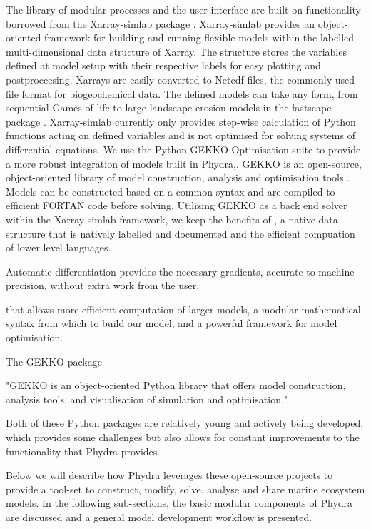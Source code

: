 \documentclass[template.tex]{subfiles}
\begin{document}
The library of modular processes and the user interface are built on functionality borrowed from the Xarray-simlab package \citep{Bovy2018Xarray-simlab:Interactively}. Xarray-simlab provides an object-oriented framework for building and running flexible models within the labelled multi-dimensional data structure of Xarray. The structure stores the variables defined at model setup with their respective labels for easy plotting and postproccesing. Xarrays are easily converted to Netcdf files, the commonly used file format for biogeochemical data. The defined models can take any form, from sequential Games-of-life to large landscape erosion models in the fastscape package \citep{benoit_bovy_2020_3840917}. Xarray-simlab currently only provides step-wise calculation of Python functions acting on defined variables and is not optimised for solving systems of differential equations. 
We use the Python GEKKO Optimisation suite to provide a more robust integration of models built in Phydra,. GEKKO is an open-source, object-oriented library of model construction, analysis and optimisation tools \citep{Beal2018GEKKOSuite}. Models can be constructed based on a common syntax and are compiled to efficient FORTAN code before solving.
Utilizing GEKKO as a back end solver within the Xarray-simlab framework, we keep the benefits of , a native data structure that is natively labelled and documented and the efficient compuation of lower level languages.

Automatic differentiation provides the necessary gradients, accurate to machine precision, without extra work from the user.

that allows more efficient computation of larger models, a modular mathematical syntax from which to build our model,
and a powerful framework for model optimisation.

The GEKKO package 

"GEKKO is an object-oriented Python library that offers model construction, analysis tools, and visualisation of simulation and optimisation."

Both of these Python packages are relatively young and actively being developed, which provides some challenges but also allows for constant improvements to the functionality that Phydra provides.

Below we will describe how Phydra leverages these open-source projects to provide a tool-set to construct, modify, solve, analyse and share marine ecosystem models. In the following sub-sections, the basic modular components of Phydra are discussed and a general model development workflow is presented.
\end{document}
